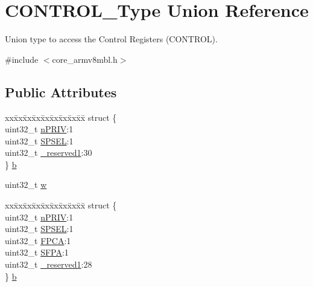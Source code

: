 \hypertarget{union_c_o_n_t_r_o_l___type}{}\section{C\+O\+N\+T\+R\+O\+L\+\_\+\+Type Union Reference}
\label{union_c_o_n_t_r_o_l___type}


Union type to access the Control Registers (C\+O\+N\+T\+R\+OL).  




{\ttfamily \#include $<$core\+\_\+armv8mbl.\+h$>$}

\subsection*{Public Attributes}
\begin{DoxyCompactItemize}
\item 
\begin{tabbing}
xx\=xx\=xx\=xx\=xx\=xx\=xx\=xx\=xx\=\kill
struct \{\\
\>uint32\_t \hyperlink{union_c_o_n_t_r_o_l___type_a35c1732cf153b7b5c4bd321cf1de9605}{nPRIV}:1\\
\>uint32\_t \hyperlink{union_c_o_n_t_r_o_l___type_a8cc085fea1c50a8bd9adea63931ee8e2}{SPSEL}:1\\
\>uint32\_t \hyperlink{union_c_o_n_t_r_o_l___type_aa7a5662079a447f801034d108f80ce49}{\_reserved1}:30\\
\} \hyperlink{union_c_o_n_t_r_o_l___type_adc6a38ab2980d0e9577b5a871da14eb9}{b}\\

\end{tabbing}\item 
uint32\+\_\+t \hyperlink{union_c_o_n_t_r_o_l___type_a6b642cca3d96da660b1198c133ca2a1f}{w}
\item 
\begin{tabbing}
xx\=xx\=xx\=xx\=xx\=xx\=xx\=xx\=xx\=\kill
struct \{\\
\>uint32\_t \hyperlink{union_c_o_n_t_r_o_l___type_a35c1732cf153b7b5c4bd321cf1de9605}{nPRIV}:1\\
\>uint32\_t \hyperlink{union_c_o_n_t_r_o_l___type_a8cc085fea1c50a8bd9adea63931ee8e2}{SPSEL}:1\\
\>uint32\_t \hyperlink{union_c_o_n_t_r_o_l___type_ac62cfff08e6f055e0101785bad7094cd}{FPCA}:1\\
\>uint32\_t \hyperlink{union_c_o_n_t_r_o_l___type_adab539fdfb991718401475bf6853669c}{SFPA}:1\\
\>uint32\_t \hyperlink{union_c_o_n_t_r_o_l___type_aa7a5662079a447f801034d108f80ce49}{\_reserved1}:28\\
\} \hyperlink{union_c_o_n_t_r_o_l___type_ae3b4861e899b1f68818b60033a3914d9}{b}\\


\end{tabbing}
\end{DoxyCompactItemize}
